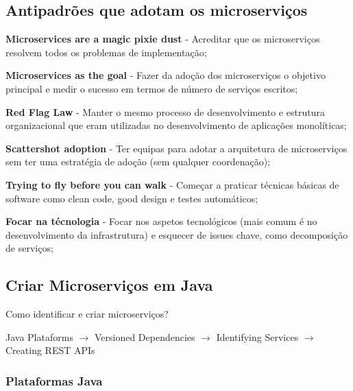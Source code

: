 \documentclass{article}
\begin{document}
\subsection{Antipadrões que adotam os microserviços}

\begin{flushleft}
  \textbf{Microservices are a magic pixie dust} - Acreditar que os microserviços
  resolvem todos os problemas de implementação;

  \vspace{1mm}

  \textbf{Microservices as the goal} - Fazer da adoção dos microserviços
  o objetivo principal e medir o sucesso em termos de número de serviços escritos;
  
  \vspace{1mm}

  \textbf{Red Flag Law} - Manter o mesmo processo de desenvolvimento e estrutura
  organizacional que eram utilizadas no desenvolvimento de aplicações monolíticas;

  \vspace{1mm}

  \textbf{Scattershot adoption} - Ter equipas para adotar a arquitetura
  de microserviços sem ter uma estratégia de adoção (sem qualquer coordenação);

  \vspace{1mm}

  \textbf{Trying to fly before you can walk} - Começar a praticar técnicas
  básicas de software como clean code, good design e testes automáticos;

  \textbf{Focar na técnologia} - Focar nos aspetos tecnológicos (mais comum
  é no desenvolvimento da infrastrutura) e esquecer de issues chave, como
  decomposição de serviços;
\end{flushleft}

\pagebreak

\subsection{Criar Microserviços em Java}

Como identificar e criar microserviços?
\begin{center}
  Java Plataforms $\rightarrow$ Versioned Dependencies $\rightarrow$ Identifying Services $\rightarrow$ Creating REST APIs
\end{center}

\subsubsection{Plataformas Java}
\end{document}
